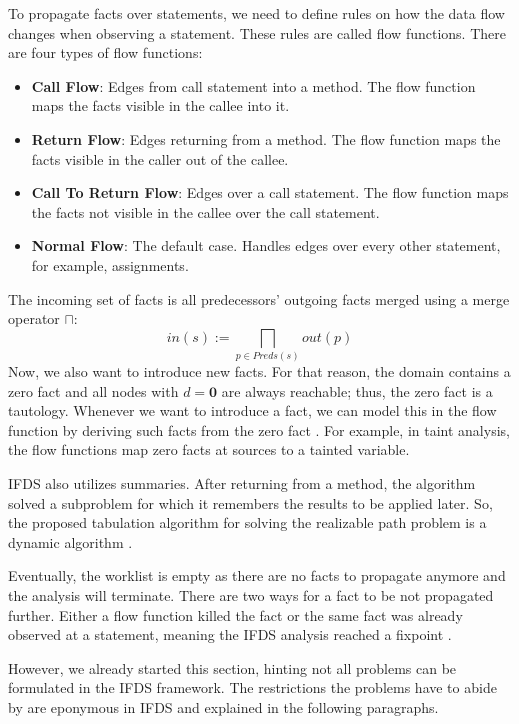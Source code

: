 \documentclass[../draft.tex]{subfiles}
\begin{document}
    To propagate facts over statements, we need to define rules on how the data flow changes when observing a statement.
    These rules are called flow functions.
    There are four types of flow functions: \cite{Reps1995}
    \begin{itemize}
        \item \textbf{Call Flow}: Edges from call statement into a method. The flow function maps the facts visible in the callee into it.
        \item \textbf{Return Flow}: Edges returning from a method. The flow function maps the facts visible in the caller out of the callee.
        \item \textbf{Call To Return Flow}: Edges over a call statement. The flow function maps the facts not visible in the callee over the call statement.
        \item \textbf{Normal Flow}: The default case. Handles edges over every other statement, for example, assignments.
    \end{itemize}
    The incoming set of facts is all predecessors' outgoing facts merged using a merge operator $\sqcap$:
    $$
        in(s) := \bigsqcap_{p \in Preds(s)} out(p)
    $$
    Now, we also want to introduce new facts.
    For that reason, the domain contains a zero fact and all nodes with $d=\textbf{0}$ are always reachable; thus, the zero fact is a tautology.
    Whenever we want to introduce a fact, we can model this in the flow function by deriving such facts from the zero fact  \cite{Reps1995}.
    For example, in taint analysis, the flow functions map zero facts at sources to a tainted variable.

    IFDS also utilizes summaries.
    After returning from a method, the algorithm solved a subproblem for which it remembers the results to be applied later.
    So, the proposed tabulation algorithm for solving the realizable path problem is a dynamic algorithm \cite{Reps1995}.

    Eventually, the worklist is empty as there are no facts to propagate anymore and the analysis will terminate.
    There are two ways for a fact to be not propagated further.
    Either a flow function killed the fact or the same fact was already observed at a statement, meaning the IFDS analysis reached a fixpoint \cite{Reps1995}.

    However, we already started this section, hinting not all problems can be formulated in the IFDS framework.
    The restrictions the problems have to abide by are eponymous in IFDS and explained in the following paragraphs.
\end{document}
